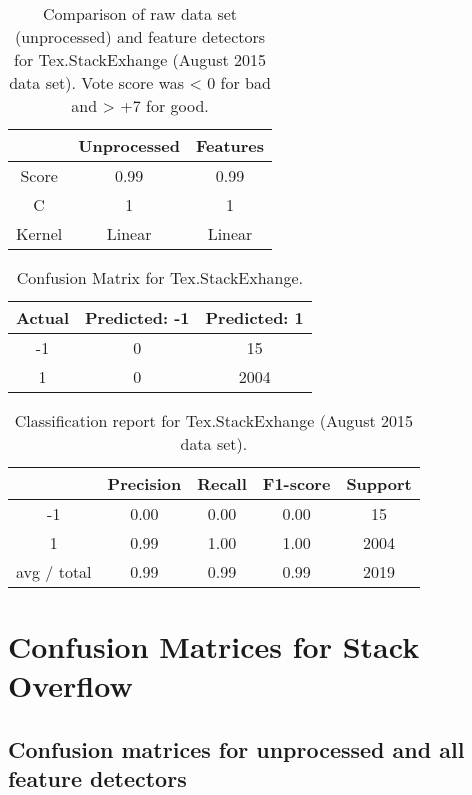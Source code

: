 \begin{table}[!h]%
	\centering
	\begin{tabular}{| c | c | c |}
		\hline
		~ 			& Unprocessed		& Features	\\ \hline
		Score 		& 0.99				& 0.99		\\ \hline
		C			& 1					& 1			\\ \hline
		Kernel		& Linear			& Linear	\\ \hline
	\end{tabular}
\caption{Comparison of raw data set (unprocessed) and feature detectors for Tex.StackExhange (August 2015 data set). Vote score was < 0 for bad and > +7 for good.}
\label{tab:singular_feature_detector_tex}
\end{table}

\begin{table}[!h]%
	\centering
	\begin{tabular}{| c | c | c |}
		\hline
		Actual 		& Predicted: -1	& Predicted: 1	\\ \hline
		-1			& 0			& 15				\\ \hline
		1			& 0			& 2004				\\ \hline
	\end{tabular}
	\caption{Confusion Matrix for Tex.StackExhange.}
	\label{tab:confusion_matrix_tex}
\end{table}

\begin{table}[!h]%
	\centering
	\begin{tabular}{| c | c | c | c | c |}
		\hline
		~				& Precision		& Recall	& F1-score		& Support	\\ \hline
		-1      		& 0.00			& 0.00		& 0.00			& 15		\\ \hline
		1       		& 0.99			& 1.00		& 1.00			& 2004		\\ \hline
		avg / total		& 0.99			& 0.99		& 0.99			& 2019		\\ \hline
	\end{tabular}
	\caption{Classification report for Tex.StackExhange (August 2015 data set).}
	\label{tab:tex_classification_report}
\end{table}

\clearpage
\section{Confusion Matrices for Stack Overflow}
\label{app:confusion_matrix}
\subsection{Confusion matrices for unprocessed and all feature detectors}

